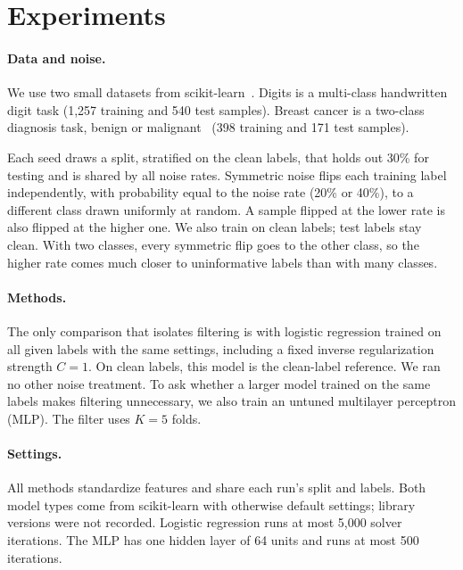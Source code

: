 \section{Experiments}\label{sec:setup}

\paragraph{Data and noise.} We use two small datasets from scikit-learn~\citep{pedregosa2012scikitlearn}. Digits is a multi-class handwritten digit task (1,257 training and 540 test samples). Breast cancer is a two-class diagnosis task, benign or malignant~\citep{mangasarian1995breast} (398 training and 171 test samples).

Each seed draws a split, stratified on the clean labels, that holds out 30\% for testing and is shared by all noise rates. Symmetric noise flips each training label independently, with probability equal to the noise rate (20\% or 40\%), to a different class drawn uniformly at random. A sample flipped at the lower rate is also flipped at the higher one. We also train on clean labels; test labels stay clean. With two classes, every symmetric flip goes to the other class, so the higher rate comes much closer to uninformative labels than with many classes.

\paragraph{Methods.} The only comparison that isolates filtering is with logistic regression trained on all given labels with the same settings, including a fixed inverse regularization strength $C = 1$. On clean labels, this model is the clean-label reference. We ran no other noise treatment. To ask whether a larger model trained on the same labels makes filtering unnecessary, we also train an untuned multilayer perceptron (MLP). The filter uses $K = 5$ folds.

\paragraph{Settings.} All methods standardize features and share each run's split and labels. Both model types come from scikit-learn with otherwise default settings; library versions were not recorded. Logistic regression runs at most 5,000 solver iterations. The MLP has one hidden layer of 64 units and runs at most 500 iterations.

